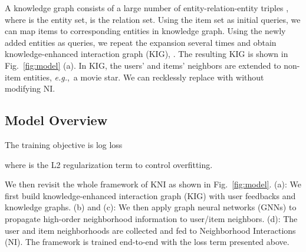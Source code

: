 \documentclass[sigconf]{acmart}
\newcommand{\eg}{\emph{e.g.},~}
\begin{document}
A knowledge graph consists of a large number of entity-relation-entity triples , where  is the entity set,  is the relation set.
Using the item set  as initial queries, we can map items to corresponding entities in knowledge graph. 
Using the newly added entities as queries, we repeat the expansion several times and obtain knowledge-enhanced interaction graph (KIG),
. 
The resulting KIG is shown in Fig.~\ref{fig:model} (a). In KIG, the users' and items' neighbors are extended to non-item entities, \eg a movie star. We can recklessly replace  with  without modifying NI.

\subsection{Model Overview}\label{sec:obj}
The training objective is log loss

where  is the L2 regularization term to control overfitting.

We then revisit the whole framework of KNI as shown in Fig.~\ref{fig:model}. (a): We first build knowledge-enhanced interaction graph (KIG) with user feedbacks and knowledge graphs. (b) and (c): We then apply graph neural networks (GNNs) to propagate high-order neighborhood information to user/item neighbors. (d): The user and item neighborhoods are collected and fed to Neighborhood Interactions (NI). The framework is trained end-to-end with the loss term presented above.
\end{document}
